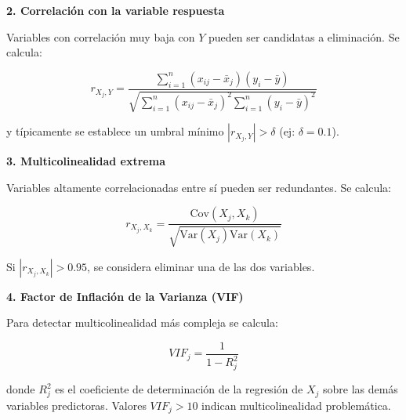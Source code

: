 \documentclass[
  letterpaper,
  DIV=11,
  numbers=noendperiod]{scrreprt}
\begin{document}
\textbf{2. Correlación con la variable respuesta}

Variables con correlación muy baja con \(Y\) pueden ser candidatas a
eliminación. Se calcula:

\[r_{X_j,Y} = \frac{\sum_{i=1}^{n}(x_{ij} - \bar{x}_j)(y_i - \bar{y})}{\sqrt{\sum_{i=1}^{n}(x_{ij} - \bar{x}_j)^2\sum_{i=1}^{n}(y_i - \bar{y})^2}}\]

y típicamente se establece un umbral mínimo \(|r_{X_j,Y}| > \delta\)
(ej: \(\delta = 0.1\)).

\textbf{3. Multicolinealidad extrema}

Variables altamente correlacionadas entre sí pueden ser redundantes. Se
calcula:

\[r_{X_j,X_k} = \frac{\text{Cov}(X_j, X_k)}{\sqrt{\text{Var}(X_j)\text{Var}(X_k)}}\]

Si \(|r_{X_j,X_k}| > 0.95\), se considera eliminar una de las dos
variables.

\textbf{4. Factor de Inflación de la Varianza (VIF)}

Para detectar multicolinealidad más compleja se calcula:

\[VIF_j = \frac{1}{1-R^2_j}\]

donde \(R^2_j\) es el coeficiente de determinación de la regresión de
\(X_j\) sobre las demás variables predictoras. Valores \(VIF_j > 10\)
indican multicolinealidad problemática.
\end{document}
